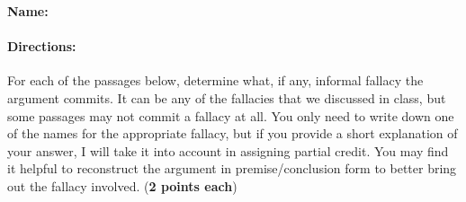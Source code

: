 \documentclass[10pt]{article}
\begin{document}
\textbf{Name:}\underline{\hspace{2in}}

\paragraph{Directions:} For each of the passages below, determine what, if any, informal fallacy the argument commits.  It can be any of the fallacies that we discussed in class, but some passages may not commit a fallacy at all.  You only need to write down one of the names for the appropriate fallacy, but if you provide a short explanation of your answer, I will take it into account in assigning partial credit.  You may find it helpful to reconstruct the argument in premise/conclusion form to better bring out the fallacy involved. (\textbf{2 points each})
\end{document}
